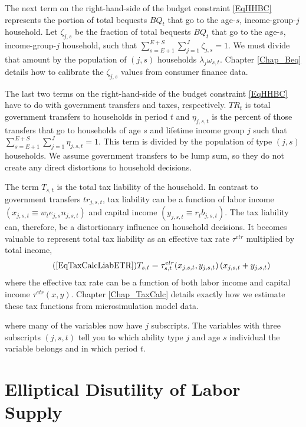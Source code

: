   The next term on the right-hand-side of the budget constraint \eqref{EqHHBC} represents the portion of total bequests $BQ_t$ that go to the age-$s$, income-group-$j$ household. Let $\zeta_{j,s}$ be the fraction of total bequests $BQ_t$ that go to the age-$s$, income-group-$j$ household, such that $\sum_{s=E+1}^{E+S}\sum_{j=1}^J\zeta_{j,s}=1$. We must divide that amount by the population of $(j,s)$ households $\lambda_j\omega_{s,t}$. Chapter \ref{Chap_Beq} details how to calibrate the $\zeta_{j,s}$ values from consumer finance data.

  The last two terms on the right-hand-side of the budget constraint \eqref{EqHHBC} have to do with government transfers and taxes, respectively. $TR_{t}$ is total government transfers to households in period $t$ and $\eta_{j,s,t}$ is the percent of those transfers that go to households of age $s$ and lifetime income group $j$ such that $\sum_{s=E+1}^{E+S}\sum_{j=1}^J\eta_{j,s,t}=1$. This term is divided by the population of type $(j,s)$ households. We assume government transfers to be lump sum, so they do not create any direct distortions to household decisions.

  The term $T_{s,t}$ is the total tax liability of the household. In contrast to government transfers $tr_{j,s,t}$, tax liability can be a function of labor income $(x_{j,s,t}\equiv w_t e_{j,s}n_{j,s,t})$ and capital income $(y_{j,s,t}\equiv r_t b_{j,s,t})$. The tax liability can, therefore, be a distortionary influence on household decisions. It becomes valuable to represent total tax liability as an effective tax rate $\tau^{etr}$ multiplied by total income,
  \begin{equation}\tag{\ref{EqTaxCalcLiabETR}}
    T_{s,t} = \tau^{etr}_{s,t}(x_{j,s,t}, y_{j,s,t})\left(x_{j,s,t} + y_{j,s,t}\right)
  \end{equation}
  where the effective tax rate can be a function of both labor income and capital income $\tau^{etr}(x,y)$. Chapter \ref{Chap_TaxCalc} details exactly how we estimate these tax functions from microsimulation model data.

  where many of the variables now have $j$ subscripts. The variables with three subscripts $(j,s,t)$ tell you to which ability type $j$ and age $s$ individual the variable belongs and in which period $t$.


\section{Elliptical Disutility of Labor Supply}\label{SecHHellipUtil}

